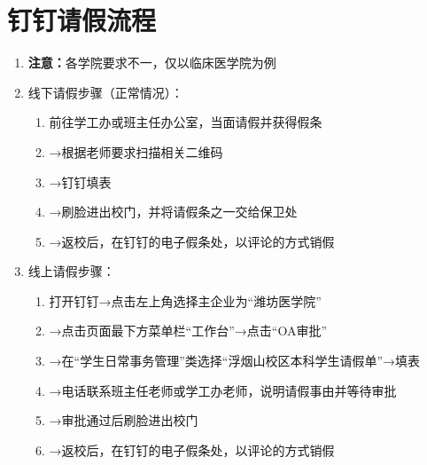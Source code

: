 \section[钉钉请假流程]{钉钉请假流程\footnotemark}
\label{leave_dingtalk}
\begin{enumerate}
    \item \textbf{注意：}各学院要求不一，仅以临床医学院为例
    \item 线下请假步骤（正常情况）：
          \begin{enumerate}
              \item 前往学工办或班主任办公室，当面请假并获得假条
              \item →根据老师要求扫描相关二维码
              \item →钉钉填表
              \item →刷脸进出校门，并将请假条之一交给保卫处
              \item →返校后，在钉钉的电子假条处，以评论的方式销假
          \end{enumerate}
    \item 线上请假步骤：
          \begin{enumerate}
              \item 打开钉钉→点击左上角选择主企业为“潍坊医学院”
              \item →点击页面最下方菜单栏“工作台”→点击“OA审批”
              \item →在“学生日常事务管理”类选择“浮烟山校区本科学生请假单”→填表
              \item →电话联系班主任老师或学工办老师，说明请假事由并等待审批
              \item →审批通过后刷脸进出校门
              \item →返校后，在钉钉的电子假条处，以评论的方式销假
          \end{enumerate}
\end{enumerate}



